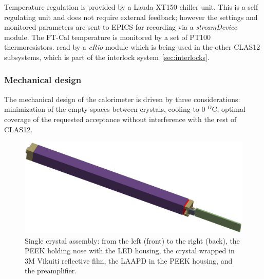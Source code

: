 Temperature regulation is provided by a
Lauda XT150 chiller unit. This is a self regulating
unit and does not require external feedback;
however the settings and monitored parameters are sent to EPICS for recording via a
{\it streamDevice} module.
The FT-Cal temperature is 
 monitored by a set of PT100 thermoresistors.
read by a {\it cRio} module which is being used in the other CLAS12 subsystems, which is part of the interlock system~\ref{sec:interlocks}.

\subsubsection{Mechanical design}
The mechanical design of the calorimeter is
driven by three considerations: minimization of the empty spaces between
crystals, cooling to 0 $^O$C; optimal coverage of the requested acceptance without interference with the rest
of CLAS12.
\begin{figure}[th!]
\centering 
\includegraphics[width=1.0\columnwidth]{./fig/sc-assembly.eps}
\caption{Single crystal assembly: from the
left (front) to the right (back), the PEEK holding nose with the LED housing, the
crystal wrapped in 3M Vikuiti reflective film, the LAAPD in the PEEK housing, and
the  preamplifier.}
\label{fig:crystalassembly} 
\end{figure}

